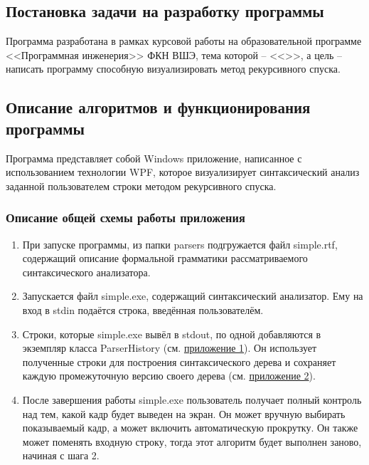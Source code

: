 \documentclass[a4paper,12pt]{article}
\begin{document}
  \subsection{Постановка задачи на разработку программы}
  Программа разработана в рамках курсовой работы на образовательной программе <<Программная инженерия>> ФКН ВШЭ,
  тема которой -- <<\CRTname>>, а цель -- написать программу способную визуализировать метод рекурсивного спуска.

  \subsection{Описание алгоритмов и функционирования программы}
  Программа представляет собой Windows приложение, написанное с использованием технологии WPF,
  которое визуализирует синтаксический анализ заданной пользователем строки методом рекурсивного спуска.
  \subsubsection{Описание общей схемы работы приложения}
  \label{sec:mainalgo}
  \begin{enumerate}
    \item При запуске программы, из папки parsers подгружается файл simple.rtf,
    содержащий описание формальной грамматики рассматриваемого синтаксического анализатора.
    \item Запускается файл simple.exe, содержащий синтаксический анализатор. Ему на вход в stdin подаётся строка, введённая пользователём.
    \item Строки, которые simple.exe вывёл в stdout, по одной добавляются в экземпляр класса ParserHistory
    (см. \hyperref[sec:classtable]{приложение 1}).
    Он использует полученные строки для построения синтаксического дерева и сохраняет каждую промежуточную версию своего дерева
    (см. \hyperref[sec:tables]{приложение 2}).
    \item После завершения работы simple.exe пользователь получает полный контроль над тем, какой кадр будет выведен на экран.
    Он может вручную выбирать показываемый кадр, а может включить автоматическую прокрутку.
    Он также может поменять входную строку, тогда этот алгоритм будет выполнен заново, начиная с шага 2.
  \end{enumerate}
\end{document}
